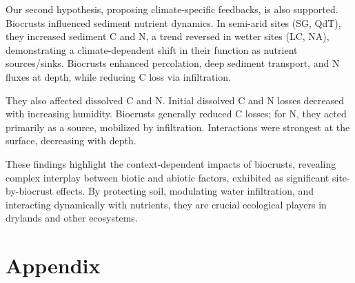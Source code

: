 Our second hypothesis, proposing climate-specific feedbacks, is also supported. Biocrusts influenced sediment nutrient dynamics. In semi-arid sites (SG, QdT), they increased sediment C and N, a trend reversed in wetter sites (LC, NA), demonstrating a climate-dependent shift in their function as nutrient sources/sinks. Biocrusts enhanced percolation, deep sediment transport, and N fluxes at depth, while reducing C loss via infiltration.

They also affected dissolved C and N. Initial dissolved C and N losses decreased with increasing humidity. Biocrusts generally reduced C losses; for N, they acted primarily as a source, mobilized by infiltration. Interactions were strongest at the surface, decreasing with depth.

These findings highlight the context-dependent impacts of biocrusts, revealing complex interplay between biotic and abiotic factors, exhibited as significant site-by-biocrust effects. By protecting soil, modulating water infiltration, and interacting dynamically with nutrients, they are crucial ecological players in drylands and other ecosystems.

\section*{Appendix}

